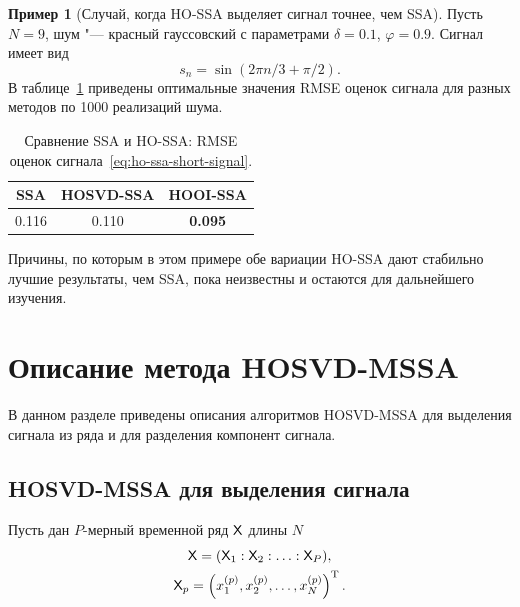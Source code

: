 \documentclass[specialist,
    substylefile = spbu.rtx,
    subf,href,colorlinks=true, 12pt]{disser}
\theoremstyle{plain}
\theoremstyle{definition}
\newtheorem{example}{Пример}[section]
\theoremstyle{remark}
\begin{document}
    \FloatBarrier

    \begin{example}[Случай, когда HO-SSA выделяет сигнал точнее, чем SSA]
        Пусть $N = 9$, шум "--- красный гауссовский с параметрами $\delta = 0.1$, $\varphi = 0.9$.
        Сигнал имеет вид
        \begin{equation}
            \label{eq:ho-ssa-short-signal}
            s_n = \sin(2\pi n/3 + \pi /2).
        \end{equation}
        В таблице~\ref{tab:tssa-better-ssa} приведены оптимальные значения RMSE оценок сигнала для разных методов
        по 1000 реализаций шума.
        \begin{table}[!ht]
            \centering
            \caption{Сравнение SSA и HO-SSA: RMSE оценок сигнала~\eqref{eq:ho-ssa-short-signal}.}
            \begin{tabular}{ccc}
                \hline
                SSA   & HOSVD-SSA & HOOI-SSA       \\
                \hline
                0.116 & 0.110     & \textbf{0.095} \\
                \hline
            \end{tabular}\label{tab:tssa-better-ssa}
        \end{table}

        Причины, по которым в этом примере обе вариации HO-SSA дают стабильно лучшие результаты, чем SSA, пока неизвестны
        и остаются для дальнейшего изучения.
    \end{example}


    \section{Описание метода HOSVD-MSSA}\label{sec:Tensor-MSSA-method-description}
    В данном разделе приведены описания алгоритмов HOSVD-MSSA для выделения сигнала из ряда и для разделения компонент сигнала.
    \subsection{HOSVD-MSSA для выделения сигнала}\label{subsec:Tensor-MSSA-method-signal-description}
    Пусть дан $P$-мерный временной ряд $\mathsf{X}$ длины $N$
    \begin{gather*}
        \mathsf{X} = (\mathsf{X}_1: \mathsf{X}_2: \ldots: \mathsf{X}_P), \\
        \mathsf{X}_p = \left(x_1^{(p)}, x_2^{(p)}, \ldots, x_N^{(p)}\right)^{\mathrm{T}}.
    \end{gather*}
\end{document}

